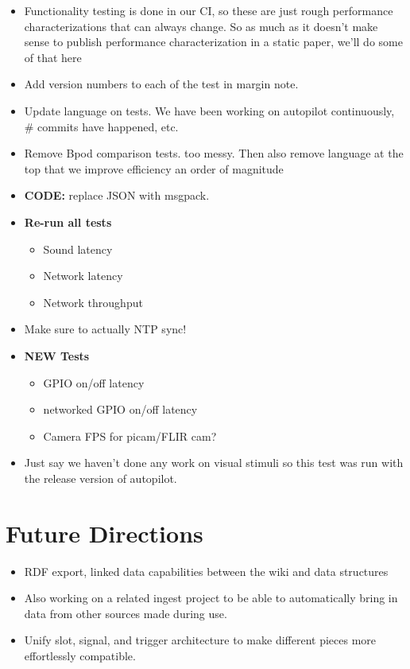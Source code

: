 \begin{itemize}
\item Functionality testing is done in our CI, so these are just rough performance characterizations that can always change. So as much as it doesn't make sense to publish performance characterization in a static paper, we'll do some of that here
\item Add version numbers to each of the test in margin note.
\item Update language on tests. We have been working on autopilot continuously, \# commits have happened, etc.
\item Remove Bpod comparison tests. too messy. Then also remove language at the top that we improve efficiency an order of magnitude
\item \textbf{CODE:} replace JSON with msgpack.
\item \textbf{Re-run all tests} 
\begin{itemize}
\item Sound latency
\item Network latency
\item Network throughput
\end{itemize}
\item Make sure to actually NTP sync!
\item \textbf{NEW Tests}
\begin{itemize}
\item GPIO on/off latency
\item networked GPIO on/off latency
\item Camera FPS for picam/FLIR cam?
\end{itemize}
\item Just say we haven't done any work on visual stimuli so this test was run with the release version of autopilot.

\end{itemize}

\section{Future Directions}

\begin{itemize}
\item RDF export, linked data capabilities between the wiki and data structures
\item Also working on a related ingest project to be able to automatically bring in data from other sources made during use. 
\item Unify slot, signal, and trigger architecture to make different pieces more effortlessly compatible.
\end{itemize}




